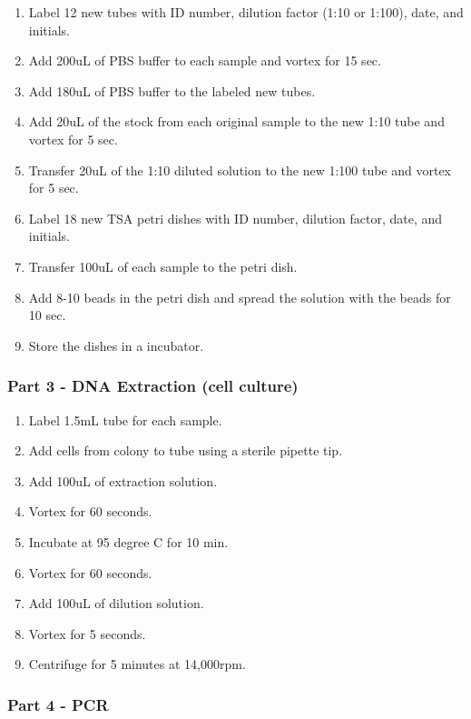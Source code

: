 \documentclass[]{article}
\providecommand{\tightlist}{%
  \setlength{\itemsep}{0pt}\setlength{\parskip}{0pt}}
\begin{document}
\begin{enumerate}
\def\labelenumi{\arabic{enumi}.}
\tightlist
\item
  Label 12 new tubes with ID number, dilution factor (1:10 or 1:100),
  date, and initials.\\
\item
  Add 200uL of PBS buffer to each sample and vortex for 15 sec.
\item
  Add 180uL of PBS buffer to the labeled new tubes.
\item
  Add 20uL of the stock from each original sample to the new 1:10 tube
  and vortex for 5 sec.
\item
  Transfer 20uL of the 1:10 diluted solution to the new 1:100 tube and
  vortex for 5 sec.
\item
  Label 18 new TSA petri dishes with ID number, dilution factor, date,
  and initials.
\item
  Transfer 100uL of each sample to the petri dish.
\item
  Add 8-10 beads in the petri dish and spread the solution with the
  beads for 10 sec.
\item
  Store the dishes in a incubator.
\end{enumerate}

\hypertarget{part-3---dna-extraction-cell-culture}{%
\subsubsection{Part 3 - DNA Extraction (cell
culture)}\label{part-3---dna-extraction-cell-culture}}

\begin{enumerate}
\def\labelenumi{\arabic{enumi}.}
\tightlist
\item
  Label 1.5mL tube for each sample.
\item
  Add cells from colony to tube using a sterile pipette tip.
\item
  Add 100uL of extraction solution.
\item
  Vortex for 60 seconds.
\item
  Incubate at 95 degree C for 10 min.
\item
  Vortex for 60 seconds.
\item
  Add 100uL of dilution solution.
\item
  Vortex for 5 seconds.
\item
  Centrifuge for 5 minutes at 14,000rpm.
\end{enumerate}

\hypertarget{part-4---pcr}{%
\subsubsection{Part 4 - PCR}\label{part-4---pcr}}
\end{document}
